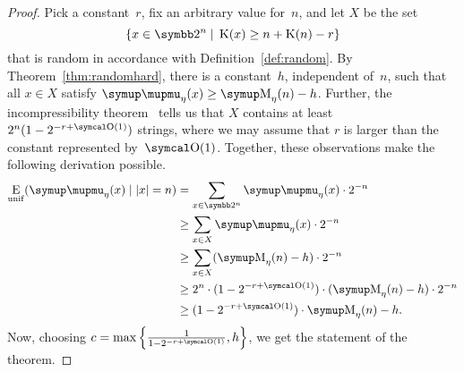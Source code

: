 \begin{proof}
  Pick a constant~$r$, fix an arbitrary value for~$n$, and let $X$ be the set
  \begin{equation*}
    \{x \in \binary^n \st \KC(x) \ge n + \KC(n) - r\}
  \end{equation*}
  that is random in accordance with Definition~\ref{def:random}.
  By Theorem~\ref{thm:randomhard}, there is a constant~$h$, independent of~$n$, such that all $x \in X$ satisfy $\mu_\eta(x) \ge \upM_\eta(n) - h$.
  Further, the incompressibility theorem~\parencite{li2008introduction} tells us that $X$ contains at least $2^n(1 - 2^{-r + \bigO(1)})$ strings, where we may assume that $r$ is larger than the constant represented by~$\bigO(1)$.
  Together, these observations make the following derivation possible.
  \begin{align*}
    \Ex_\mathrm{unif}(\mu_\eta(x) \given \length{x} = n) &= \sum_{x \in \binary^n} \mu_\eta(x) \cdot 2^{-n} \\
      &\ge \sum_{x \in X} \mu_\eta(x) \cdot 2^{-n} \\
      &\ge \sum_{x \in X} (\upM_\eta(n) - h) \cdot 2^{-n} \\
      &\ge 2^n \cdot (1 - 2^{-r + \bigO(1)}) \cdot (\upM_\eta(n) - h) \cdot 2^{-n} \\
      &\ge (1 - 2^{-r + \bigO(1)}) \cdot \upM_\eta(n) - h.
  \end{align*}
  Now, choosing $c = \max\left\{\frac{1}{1 - 2^{-r + \bigO(1)}}, h\right\}$, we get the statement of the theorem.
\end{proof}

